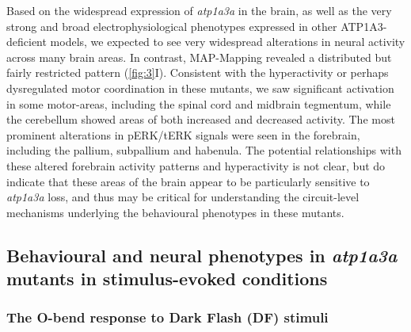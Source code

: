 \documentclass[9.5pt,lineno]{RandlettLab_elife}
\begin{document}
Based on the widespread expression of \emph{atp1a3a} in the brain, as well as the very strong and broad electrophysiological phenotypes expressed in other ATP1A3-deficient models, we expected to see very widespread alterations in neural activity across many brain areas.
In contrast, MAP-Mapping revealed a distributed but fairly restricted pattern (\autoref{fig:3}I).
Consistent with the hyperactivity or perhaps dysregulated motor coordination in these mutants, we saw significant activation in some motor-areas, including the spinal cord and midbrain tegmentum, while the cerebellum showed areas of both increased and decreased activity.
The most prominent alterations in pERK/tERK signals were seen in the forebrain, including the pallium, subpallium and habenula. 
The potential relationships with these altered forebrain activity patterns and hyperactivity is not clear, but do indicate that these areas of the brain appear to be particularly sensitive to \emph{atp1a3a} loss, and thus may be critical for understanding the circuit-level mechanisms underlying the behavioural phenotypes in these mutants. 

\subsection{Behavioural and neural phenotypes in \emph{atp1a3a} mutants in stimulus-evoked conditions}
\subsubsection{The O-bend response to Dark Flash (DF) stimuli}
\end{document}
